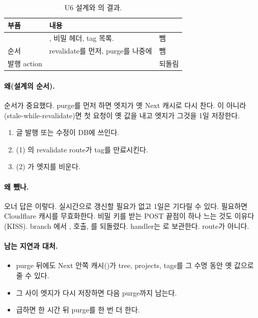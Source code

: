 \begin{table}[H]
  \caption{U6 설계와 의 결과.}
  \label{tab:cc3-u6}
  \centering\small
  \begin{tabularx}{\linewidth}{@{}L{3.6cm} Y L{2.6cm}@{}}
    \toprule
    부품 & 내용 &  \\
    \midrule
     & , 비밀 헤더, tag 목록.  & 뺌 \\
    \midrule
     순서 & revalidate를 먼저, purge를 나중에 & 뺌 \\
    \midrule
    발행 action &  & 되돌림 \\
    \bottomrule
  \end{tabularx}
\end{table}

\paragraph{왜(설계의 순서).}
순서가 중요했다. purge를 먼저 하면 엣지가 옛 Next 캐시로 다시 찬다.
이 아니라 (stale-while-revalidate)면 첫 요청이 옛 값을 내고 엣지가 그것을 1일 저장한다.
\begin{enumerate}[nosep]
  \item 글 발행 또는 수정이 DB에 쓰인다.
  \item (1) 의 revalidate route가 tag를 만료시킨다.
  \item (2) 가 엣지를 비운다.
\end{enumerate}

\paragraph{왜 뺐나.}
오너 답은 이렇다. 실시간으로 갱신할 필요가 없고 1일은 기다릴 수 있다. 필요하면 Cloudflare 캐시를 무효화한다.
비밀 키를 받는 POST 끝점이 하나 느는 것도 이유다(KISS).
branch 에서 ,  호출, 를 되돌렸다.
handler는 로 보관한다. route가 아니다.

\paragraph{남는 지연과 대처.}
\begin{itemize}[nosep]
  \item purge 뒤에도 Next 안쪽 캐시()가 tree, projects, tags를 그 수명 동안 옛 값으로 줄 수 있다.
  \item 그 사이 엣지가 다시 저장하면 다음 purge까지 남는다.
  \item 급하면 한 시간 뒤 purge를 한 번 더 한다.
\end{itemize}


